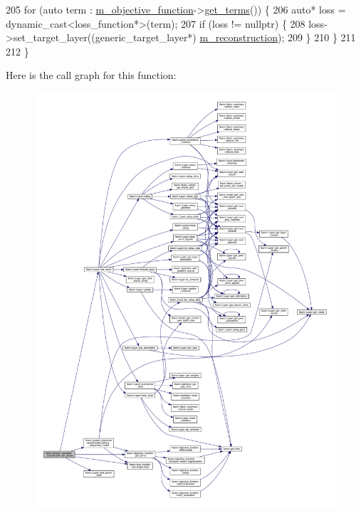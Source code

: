 \begin{DoxyCode}
205   \textcolor{keywordflow}{for} (\textcolor{keyword}{auto} term : \hyperlink{classlbann_1_1model_a24c50e7108dd7698671aed7df5b22e8b}{m\_objective\_function}->\hyperlink{classlbann_1_1objective__function_a510544e9e511be54a50efd39226de345}{get\_terms}()) \{
206     \textcolor{keyword}{auto}* loss = \textcolor{keyword}{dynamic\_cast<}loss\_function*\textcolor{keyword}{>}(term);
207     \textcolor{keywordflow}{if} (loss != \textcolor{keyword}{nullptr}) \{
208       loss->set\_target\_layer((generic\_target\_layer*) \hyperlink{classlbann_1_1greedy__layerwise__autoencoder_a8238d2e3e723543c8b6f7f5c61a9ca06}{m\_reconstruction});
209     \}
210   \}
211 
212 \}
\end{DoxyCode}
Here is the call graph for this function\+:\nopagebreak
\begin{figure}[H]
\begin{center}
\leavevmode
\includegraphics[width=350pt]{classlbann_1_1greedy__layerwise__autoencoder_a5f237f1f6285475c5493a7d15dc32096_cgraph}
\end{center}
\end{figure}
